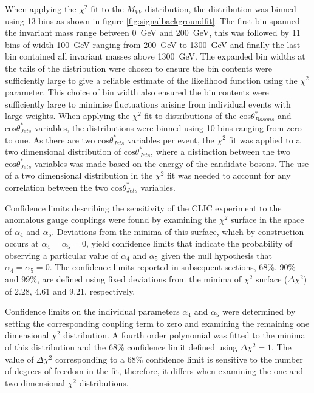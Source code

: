 When applying the $\chi^{2}$ fit to the $M_{VV}$ distribution, the distribution was binned using 13 bins as shown in figure \ref{fig:signalbackgroundfit}.  The first bin spanned the invariant mass range between 0~GeV and 200~GeV, this was followed by 11 bins of width 100~GeV ranging from 200~GeV to 1300~GeV and finally the last bin contained all invariant masses above 1300~GeV.  The expanded bin widths at the tails of the distribution were chosen to ensure the bin contents were sufficiently large to give a reliable estimate of the likelihood function using the $\chi^{2}$ parameter.  This choice of bin width also ensured the bin contents were sufficiently large to minimise fluctuations arising from individual events with large weights.  When applying the $\chi^{2}$ fit to distributions of the $\text{cos}\theta^{*}_{Bosons}$ and $\text{cos}\theta^{*}_{Jets}$ variables, the distributions were binned using 10 bins ranging from zero to one.  As there are two $\text{cos}\theta^{*}_{Jets}$ variables per event, the $\chi^{2}$ fit was applied to a two dimensional distribution of $\text{cos}\theta^{*}_{Jets}$, where a distinction between the two $\text{cos}\theta^{*}_{Jets}$ variables was made based on the energy of the candidate bosons.  The use of a two dimensional distribution in the $\chi^{2}$ fit was needed to account for any correlation between the two $\text{cos}\theta^{*}_{Jets}$ variables.  

Confidence limits describing the sensitivity of the CLIC experiment to the anomalous gauge couplings were found by examining the $\chi^{2}$ surface in the space of $\alpha_{4}$ and $\alpha_{5}$.  Deviations from the minima of this surface, which by construction occurs at $\alpha_{4} = \alpha_{5} = 0$, yield confidence limits that indicate the probability of observing a particular value of $\alpha_{4}$ and $\alpha_{5}$ given the null hypothesis that $\alpha_{4} = \alpha_{5} = 0$.  The confidence limits reported in subsequent sections, 68\%, 90\% and 99\%, are defined using fixed deviations from the minima of $\chi^{2}$ surface ($\Delta\chi^{2}$) of 2.28, 4.61 and 9.21{,} respectively.

Confidence limits on the individual parameters $\alpha_{4}$ and $\alpha_{5}$ were determined by setting the corresponding coupling term to zero and examining the remaining one dimensional $\chi^{2}$ distribution.  A fourth order polynomial was fitted to the minima of this distribution and the 68\% confidence limit defined using $\Delta\chi^{2} = 1$.  The value of $\Delta\chi^{2}$ corresponding to a 68\% confidence limit is sensitive to the number of degrees of freedom in the fit, therefore, it differs when examining the one and two dimensional $\chi^{2}$ distributions.  

